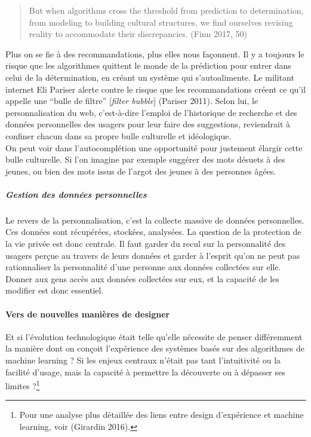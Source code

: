 \documentclass[]{article}
\let\oldparagraph\paragraph
\renewcommand{\paragraph}[1]{\oldparagraph{#1}\mbox{}}
\let\oldsubparagraph\subparagraph
\renewcommand{\subparagraph}[1]{\oldsubparagraph{#1}\mbox{}}
\begin{document}
\begin{quote}
But when algorithms cross the threshold from prediction to
determination, from modeling to building cultural structures, we find
ourselves revising reality to accommodate their discrepancies. (Finn
2017, 50)
\end{quote}

Plus on se fie à des recommandations, plus elles nous façonnent. Il y a
toujours le risque que les algorithmes quittent le monde de la
prédiction pour entrer dans celui de la détermination, en créant un
système qui s'autoalimente. Le militant internet Eli Pariser alerte
contre le risque que les recommandations créent ce qu'il appelle une
``bulle de filtre'' {[}\emph{filter bubble}{]} (Pariser 2011). Selon
lui, le personnalisation du web, c'est-à-dire l'emploi de l'historique
de recherche et des données personnelles des usagers pour leur faire des
suggestions, reviendrait à confiner chacun dans sa propre bulle
culturelle et idéologique.\\
On peut voir dans l'autocomplétion une opportunité pour justement
élargir cette bulle culturelle. Si l'on imagine par exemple suggérer des
mots désuets à des jeunes, ou bien des mots issus de l'argot des jeunes
à des personnes âgées.

\hypertarget{gestion-des-donnuxe9es-personnelles}{%
\subparagraph{Gestion des données
personnelles}\label{gestion-des-donnuxe9es-personnelles}}

Le revers de la personnalisation, c'est la collecte massive de données
personnelles. Ces données sont récupérées, stockées, analysées. La
question de la protection de la vie privée est donc centrale. Il faut
garder du recul sur la personnalité des usagers perçue au travers de
leurs données et garder à l'esprit qu'on ne peut pas rationnaliser la
personnalité d'une personne aux données collectées sur elle. Donner aux
gens accès aux données collectées sur eux, et la capacité de les
modifier est donc essentiel.

\hypertarget{vers-de-nouvelles-maniuxe8res-de-designer}{%
\paragraph{Vers de nouvelles manières de
designer}\label{vers-de-nouvelles-maniuxe8res-de-designer}}

Et si l'évolution technologique était telle qu'elle nécessite de penser
différemment la manière dont on conçoit l'expérience des systèmes basés
sur des algorithmes de machine learning ? Si les enjeux centraux n'était
pas tant l'intuitivité ou la facilité d'usage, mais la capacité à
permettre la découverte ou à dépasser ses limites ?\footnote{Pour une
  analyse plus détaillée des liens entre design d'expérience et machine
  learning, voir (Girardin 2016).}
\end{document}
